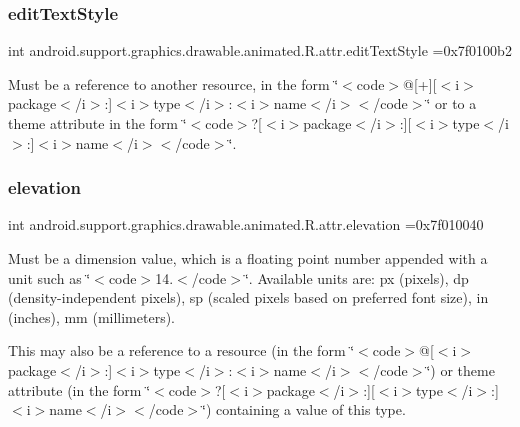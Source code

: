 \subsubsection{\texorpdfstring{edit\+Text\+Style}{editTextStyle}}
{\footnotesize\ttfamily int android.\+support.\+graphics.\+drawable.\+animated.\+R.\+attr.\+edit\+Text\+Style =0x7f0100b2\hspace{0.3cm}{\ttfamily [static]}}

Must be a reference to another resource, in the form \char`\"{}$<$code$>$@\mbox{[}+\mbox{]}\mbox{[}$<$i$>$package$<$/i$>$\+:\mbox{]}$<$i$>$type$<$/i$>$\+:$<$i$>$name$<$/i$>$$<$/code$>$\char`\"{} or to a theme attribute in the form \char`\"{}$<$code$>$?\mbox{[}$<$i$>$package$<$/i$>$\+:\mbox{]}\mbox{[}$<$i$>$type$<$/i$>$\+:\mbox{]}$<$i$>$name$<$/i$>$$<$/code$>$\char`\"{}. \mbox{\label{classandroid_1_1support_1_1graphics_1_1drawable_1_1animated_1_1R_1_1attr_a71fd5f83eeaab303621afb6ec0fd3e80}} 
\subsubsection{\texorpdfstring{elevation}{elevation}}
{\footnotesize\ttfamily int android.\+support.\+graphics.\+drawable.\+animated.\+R.\+attr.\+elevation =0x7f010040\hspace{0.3cm}{\ttfamily [static]}}

Must be a dimension value, which is a floating point number appended with a unit such as \char`\"{}$<$code$>$14.\+5sp$<$/code$>$\char`\"{}. Available units are\+: px (pixels), dp (density-\/independent pixels), sp (scaled pixels based on preferred font size), in (inches), mm (millimeters). 

This may also be a reference to a resource (in the form \char`\"{}$<$code$>$@\mbox{[}$<$i$>$package$<$/i$>$\+:\mbox{]}$<$i$>$type$<$/i$>$\+:$<$i$>$name$<$/i$>$$<$/code$>$\char`\"{}) or theme attribute (in the form \char`\"{}$<$code$>$?\mbox{[}$<$i$>$package$<$/i$>$\+:\mbox{]}\mbox{[}$<$i$>$type$<$/i$>$\+:\mbox{]}$<$i$>$name$<$/i$>$$<$/code$>$\char`\"{}) containing a value of this type. \mbox{\label{classandroid_1_1support_1_1graphics_1_1drawable_1_1animated_1_1R_1_1attr_af376f663588b39f16243f3c03f9cd4d5}} 
